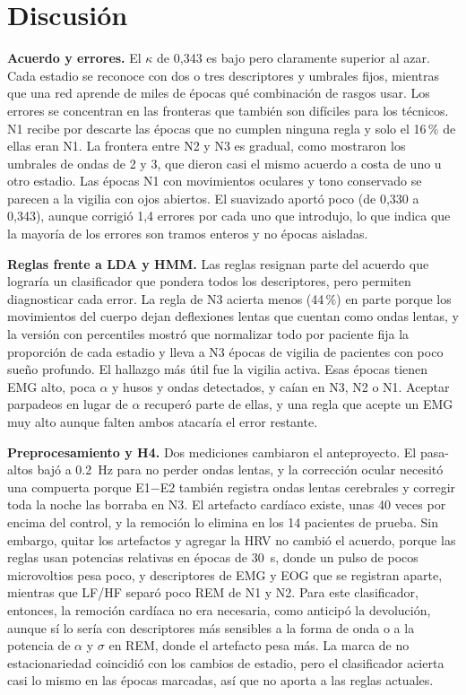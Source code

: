 \section{Discusión}
\textbf{Acuerdo y errores.} El $\kappa$ de 0,343 es bajo pero claramente superior al azar. Cada estadio se reconoce con dos o tres descriptores y umbrales fijos, mientras que una red aprende de miles de épocas qué combinación de rasgos usar. Los errores se concentran en las fronteras que también son difíciles para los técnicos. N1 recibe por descarte las épocas que no cumplen ninguna regla y solo el 16\,\% de ellas eran N1. La frontera entre N2 y N3 es gradual, como mostraron los umbrales de ondas de 2 y 3, que dieron casi el mismo acuerdo a costa de uno u otro estadio. Las épocas N1 con movimientos oculares y tono conservado se parecen a la vigilia con ojos abiertos. El suavizado aportó poco (de 0,330 a 0,343), aunque corrigió 1,4 errores por cada uno que introdujo, lo que indica que la mayoría de los errores son tramos enteros y no épocas aisladas.

\textbf{Reglas frente a LDA y HMM.} Las reglas resignan parte del acuerdo que lograría un clasificador que pondera todos los descriptores, pero permiten diagnosticar cada error. La regla de N3 acierta menos (44\,\%) en parte porque los movimientos del cuerpo dejan deflexiones lentas que cuentan como ondas lentas, y la versión con percentiles mostró que normalizar todo por paciente fija la proporción de cada estadio y lleva a N3 épocas de vigilia de pacientes con poco sueño profundo. El hallazgo más útil fue la vigilia activa. Esas épocas tienen EMG alto, poca $\alpha$ y husos y ondas detectados, y caían en N3, N2 o N1. Aceptar parpadeos en lugar de $\alpha$ recuperó parte de ellas, y una regla que acepte un EMG muy alto aunque falten ambos atacaría el error restante.

\textbf{Preprocesamiento y H4.} Dos mediciones cambiaron el anteproyecto. El pasa-altos bajó a \SI{0,2}{\hertz} para no perder ondas lentas, y la corrección ocular necesitó una compuerta porque E1$-$E2 también registra ondas lentas cerebrales y corregir toda la noche las borraba en N3. El artefacto cardíaco existe, unas 40 veces por encima del control, y la remoción lo elimina en los 14 pacientes de prueba. Sin embargo, quitar los artefactos y agregar la HRV no cambió el acuerdo, porque las reglas usan potencias relativas en épocas de \SI{30}{\second}, donde un pulso de pocos microvoltios pesa poco, y descriptores de EMG y EOG que se registran aparte, mientras que LF/HF separó poco REM de N1 y N2. Para este clasificador, entonces, la remoción cardíaca no era necesaria, como anticipó la devolución, aunque sí lo sería con descriptores más sensibles a la forma de onda o a la potencia de $\alpha$ y $\sigma$ en REM, donde el artefacto pesa más. La marca de no estacionariedad coincidió con los cambios de estadio, pero el clasificador acierta casi lo mismo en las épocas marcadas, así que no aporta a las reglas actuales.

